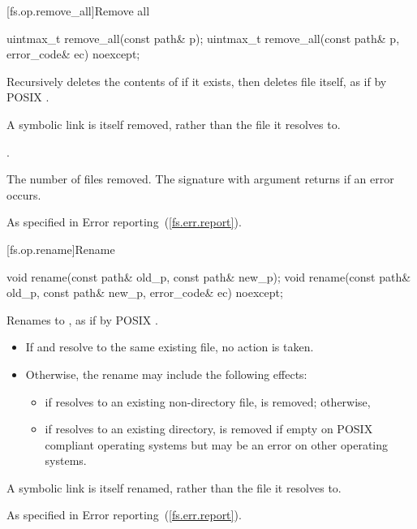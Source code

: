 [fs.op.remove_all]{Remove all}

%
\begin{itemdecl}
uintmax_t remove_all(const path& p);
uintmax_t remove_all(const path& p, error_code& ec) noexcept;
\end{itemdecl}

\begin{itemdescr}
\pnum
\effects Recursively deletes the contents of  if it exists,
  then deletes file  itself, as if by POSIX .
\begin{note} A symbolic link is itself removed, rather than the file it
  resolves to. \end{note}

\pnum
\postcondition {}.

\pnum
\returns The number of files removed. The signature with argument
   returns  if an error
  occurs.

\pnum
\throws As specified in Error reporting~(\ref{fs.err.report}).
\end{itemdescr}


[fs.op.rename]{Rename}

%
\begin{itemdecl}
void rename(const path& old_p, const path& new_p);
void rename(const path& old_p, const path& new_p, error_code& ec) noexcept;
\end{itemdecl}

\begin{itemdescr}
\pnum
\effects Renames  to , as if by
  POSIX .

\begin{note}
\begin{itemize}
\item If  and  resolve to the same existing file,
   no action is taken.
\item Otherwise, the rename may include the following effects:
\begin{itemize}
\item if  resolves to an existing non-directory file,
     is removed; otherwise,
\item if  resolves to an existing directory,
     is removed if empty on POSIX compliant operating systems
    but may be an error on other operating systems.
\end{itemize}
\end{itemize}
A symbolic link is itself renamed, rather than the file it resolves to.
\end{note}

\pnum
\throws As specified in Error reporting~(\ref{fs.err.report}).
\end{itemdescr}


